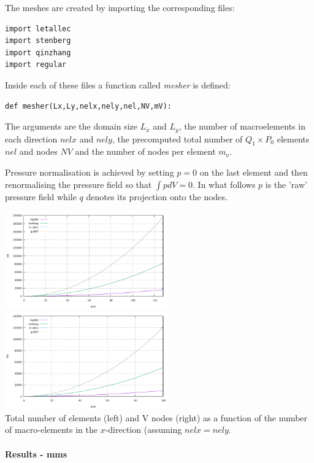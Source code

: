 The meshes are created by importing the corresponding files:
\begin{lstlisting} 
import letallec
import stenberg
import qinzhang
import regular
\end{lstlisting} 
Inside each of these files a function called {\sl mesher} is defined: 
\begin{lstlisting} 
def mesher(Lx,Ly,nelx,nely,nel,NV,mV):
\end{lstlisting} 
The arguments are the domain size $L_x$ and $L_y$, the number of macroelements
in each direction $nelx$ and $nely$, the precomputed total number of $Q_1\times P_0$ 
elements $nel$ and nodes $NV$ and the number of nodes per element $m_\upnu$.  

Pressure normalisation is achieved by setting $p=0$ on the last element and then 
renormalising the pressure field so that $\int p dV=0$. In what follows $p$ is the 'raw' pressure
field while $q$ denotes its projection onto the nodes. 

\begin{center}
\includegraphics[width=7cm]{python_codes/fieldstone_78/images/nel}
\includegraphics[width=7cm]{python_codes/fieldstone_78/images/NV}\\
{\captionfont Total number of elements (left) and V nodes (right) as a function of the number
of macro-elements in the $x$-direction (assuming $nelx=nely$.}
\end{center}


\paragraph{Results - mms}

